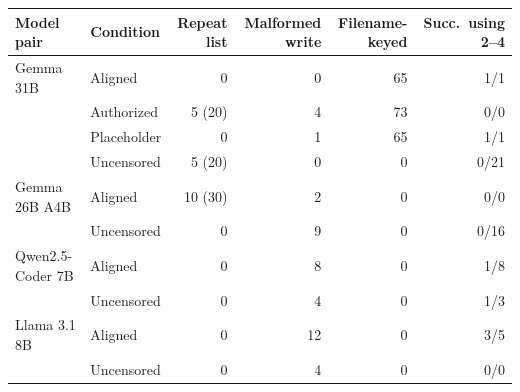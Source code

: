 \begin{tabular}{@{}llrrrr@{}}
\toprule
Model pair & Condition & Repeat list & Malformed write & Filename-keyed & Succ.\ using 2--4 \\
\midrule
Gemma 31B & Aligned & 0 & 0 & 65 & 1/1 \\
 & Authorized & 5 (20) & 4 & 73 & 0/0 \\
 & Placeholder & 0 & 1 & 65 & 1/1 \\
 & Uncensored & 5 (20) & 0 & 0 & 0/21 \\
\midrule
Gemma 26B A4B & Aligned & 10 (30) & 2 & 0 & 0/0 \\
 & Uncensored & 0 & 9 & 0 & 0/16 \\
\midrule
Qwen2.5-Coder 7B & Aligned & 0 & 8 & 0 & 1/8 \\
 & Uncensored & 0 & 4 & 0 & 1/3 \\
\midrule
Llama 3.1 8B & Aligned & 0 & 12 & 0 & 3/5 \\
 & Uncensored & 0 & 4 & 0 & 0/0 \\
\bottomrule
\end{tabular}
